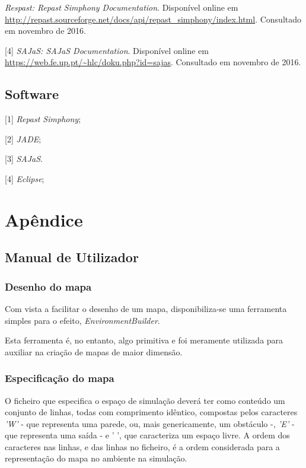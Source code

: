 \documentclass[12pt]{article}
\begin{document}
\begin{titlepage}
[3] \textit{Respast: Repast Simphony Documentation}. Disponível online em \url{http://repast.sourceforge.net/docs/api/repast_simphony/index.html}. Consultado em novembro de 2016.

[4] \textit{SAJaS: SAJaS Documentation}. Disponível online em \url{https://web.fe.up.pt/~hlc/doku.php?id=sajas}. Consultado em novembro de 2016.


\subsection{Software}
[1] \textit{Repast Simphony};

[2] \textit{JADE};

[3] \textit{SAJaS}.

[4] \textit{Eclipse};

\newpage

\section{Apêndice}


\subsection{Manual de Utilizador}

\subsubsection{Desenho do mapa}

Com vista a facilitar o desenho de um mapa, disponibiliza-se uma ferramenta simples para o efeito, \textit{EnvironmentBuilder}.

Esta ferramenta é, no entanto, algo primitiva e foi meramente utilizada para auxiliar na criação de mapas de maior dimensão.

\subsubsection{Especificação do mapa}

O ficheiro que especifica o espaço de simulação deverá ter como conteúdo um conjunto de linhas, todas com comprimento idêntico, compostas pelos caracteres \textit{'W'} - que representa uma parede, ou, mais genericamente, um obstáculo -, \textit{'E'} - que representa uma saída - e {' '}, que caracteriza um espaço livre. A ordem dos caracteres nas linhas, e das linhas no ficheiro, é a ordem considerada para a representação do mapa no ambiente na simulação.


\end{titlepage}
\end{document}
